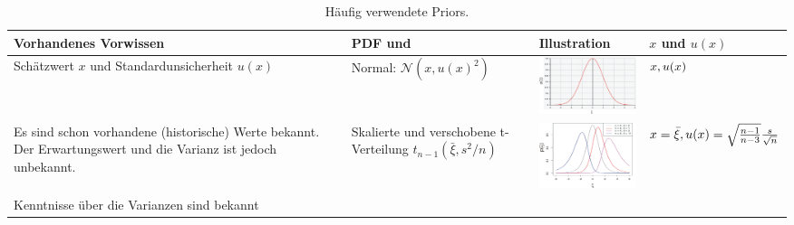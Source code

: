 \begin{table}[!htbp]
	\caption{Häufig verwendete Priors.}
	\centering
	\begin{tabular}{m{3cm} |m{3cm} m{4.5cm}| m{3cm}}  \hline
		Vorhandenes Vorwissen & PDF \hspace{1em} und & Illustration & $x$ und $u(x)$\\
		\hline \vspace*{2ex}
		Schätzwert $x$ und Standardunsicherheit $u(x)$ \vspace*{4ex} &
		Normal: $\mathcal{N} (x, u(x)^2)$ &
				\includegraphics[width=40mm]{12_vorlesung_GUMS2/media/Prior_Normalverteilung.png}
	 & $x,\newline u(x)$ \\
	 \hline \vspace*{2ex}
	 Es sind schon vorhandene (historische) Werte bekannt. Der Erwartungswert und die Varianz ist jedoch unbekannt. \vspace*{4ex} &
	 Skalierte und \newline verschobene t-Verteilung $t_{n-1}(\bar \xi, s^2/n)$ &
	 \includegraphics[width=40mm]{12_vorlesung_GUMS2/media/Prior_Studentverteilung.png}
	 & $x = \bar \xi, \newline u(x) = \sqrt{\frac{n-1}{n-3}} \frac{s}{\sqrt{n}}$ \\
	 \hline \vspace*{6ex}
	 Kenntnisse über die Varianzen sind bekannt \vspace*{4ex} &


\end{tabular}
\end{table}

